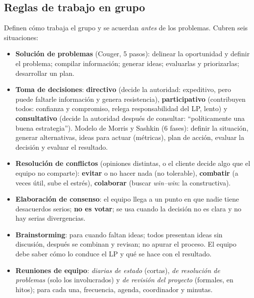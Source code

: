 \documentclass[11pt,a4paper]{article}
\begin{document}
\subsection{Reglas de trabajo en grupo}
Definen cómo trabaja el grupo y se acuerdan \emph{antes} de los problemas. Cubren seis situaciones:
\begin{itemize}
  \item \textbf{Solución de problemas} (Couger, 5 pasos): delinear la oportunidad y definir el problema;
  compilar información; generar ideas; evaluarlas y priorizarlas; desarrollar un plan.
  \item \textbf{Toma de decisiones}: \textbf{directivo} (decide la autoridad: expeditivo, pero puede faltarle
  información y genera resistencia), \textbf{participativo} (contribuyen todos: confianza y compromiso, relega
  responsabilidad del LP, lento) y \textbf{consultativo} (decide la autoridad después de consultar:
  ``políticamente una buena estrategia''). Modelo de Morris y Sashkin (6 fases): definir la situación, generar
  alternativas, ideas para actuar (métricas), plan de acción, evaluar la decisión y evaluar el resultado.
  \item \textbf{Resolución de conflictos} (opiniones distintas, o el cliente decide algo que el equipo no
  comparte): \textbf{evitar} o no hacer nada (no tolerable), \textbf{combatir} (a veces útil, sube el estrés),
  \textbf{colaborar} (buscar \emph{win--win}: la constructiva).
  \item \textbf{Elaboración de consenso}: el equipo llega a un punto en que nadie tiene desacuerdos serios;
  \textbf{no es votar}; se usa cuando la decisión no es clara y no hay serias divergencias.
  \item \textbf{Brainstorming}: para cuando faltan ideas; todos presentan ideas sin discusión, después se
  combinan y revisan; no apurar el proceso. El equipo debe saber cómo lo conduce el LP y qué se hace con el
  resultado.
  \item \textbf{Reuniones de equipo}: \emph{diarias de estado} (cortas), \emph{de resolución de problemas} (solo
  los involucrados) y \emph{de revisión del proyecto} (formales, en hitos); para cada una, frecuencia, agenda,
  coordinador y minutas.
\end{itemize}
\end{document}
